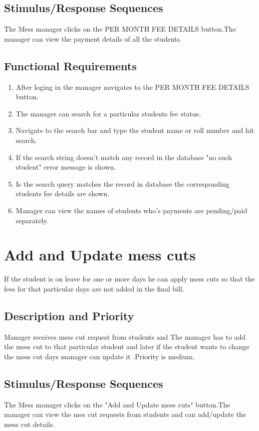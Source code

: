 \documentclass{scrreprt}
\begin{document}
\subsection{Stimulus/Response Sequences}
The Mess manager clicks on the PER MONTH FEE DETAILS button.The manager can view the payment details of all the students.

\subsection{Functional Requirements}
\begin{enumerate}
\item After loging in the manager navigates to the PER MONTH FEE DETAILS  button.
\item The manager can search for a particular students fee status.  
\item Navigate to the search bar and type the student name or roll number and hit search.
\item If the search string doesn't match any record in the database "no such student" error message is shown.
\item Is the search query matches the record in database the corresponding students fee details are shown. 
\item Manager can view the names of students who's payments are pending/paid separately.
\end{enumerate}

\section{Add and Update mess cuts}
If the student is on leave for one or more days he can apply mess cuts so that the fees for that particular days are not added in the final bill.


\subsection{Description and Priority}
Manager receives mess cut request from students and The manager has to add the mess cut to that particular student and later if the student wants to change the mess cut days manager can update it .Priority is medium.

\subsection{Stimulus/Response Sequences}
The Mess manager clicks on the "Add and Update mess cuts" button.The manager can view the mes cut requests from students and can add/update the mess cut details.
\end{document}
